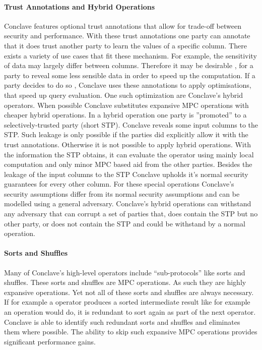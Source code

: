 \label{Trust_label}	
\paragraph{Trust Annotations and Hybrid Operations}
Conclave features optional trust annotations that allow for trade-off between security and performance. With these trust annotations one party can annotate that it does trust another party to learn the values of a specific column. There exists a variety of use cases that fit these mechanism. For example, the sensitivity of data may largely differ between columns. Therefore it may be desirable , for a party to reveal some less sensible data in order to speed up the computation. If a party decides to do so , Conclave uses these annotations to apply optimisations, that speed up query evaluation. One such optimization are Conclave's hybrid operators. When possible Conclave substitutes expansive MPC operations with cheaper hybrid operations. In a hybrid operation one party is ''promoted'' to a selectively-trusted party (short STP). Conclave reveals some input columns to the STP. Such leakage is only possible if the parties did explicitly allow it with the trust annotations. Otherwise it is not possible to apply hybrid operations. With the information the STP obtains, it can evaluate the operator using mainly local computation and only minor MPC based aid from the other parties. Besides the leakage of the input columns to the STP Conclave upholds it's normal security guarantees for every other column. For these special operations Conclave's security assumptions differ from its normal security assumptions and can be modelled using a general adversary. Conclave's hybrid operations can withstand any adversary that can corrupt a set of parties that, does contain the STP but no other party, or does not contain the STP and could be withstand by a normal operation. 
\paragraph{Sorts and Shuffles}
Many of Conclave's high-level operators include ``sub-protocols'' like sorts and shuffles. These sorts and shuffles are MPC operations. As such they are highly expansive operations. Yet not all of these sorts and shuffles are always necessary. If for example a operator produces a sorted intermediate result like for example an  operation would do, it is redundant to sort again as part of the next operator. Conclave is able to identify such redundant sorts and shuffles and eliminates them where possible. The ability to skip such expansive MPC operations provides significant performance gains.

